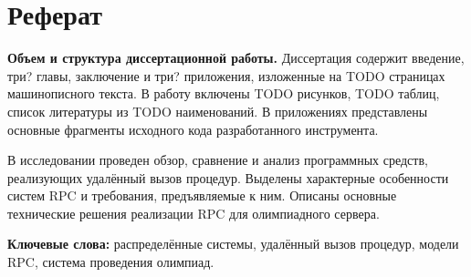 \chapter*{Реферат}
\textbf{Объем и структура диссертационной работы.}
Диссертация содержит введение, три? главы, заключение и три? приложения,
изложенные на TODO страницах машинописного текста.
В работу включены TODO рисунков, TODO таблиц,
список литературы из TODO наименований.
В приложениях представлены основные фрагменты исходного кода
разработанного инструмента.

В исследовании проведен обзор, сравнение и анализ программных средств,
реализующих удалённый вызов процедур.
Выделены характерные особенности систем RPC и требования, предъявляемые к ним.
Описаны основные технические решения реализации RPC для олимпиадного сервера.

\textbf{Ключевые слова:}
распределённые системы,
удалённый вызов процедур,
модели RPC,
система проведения олимпиад.
